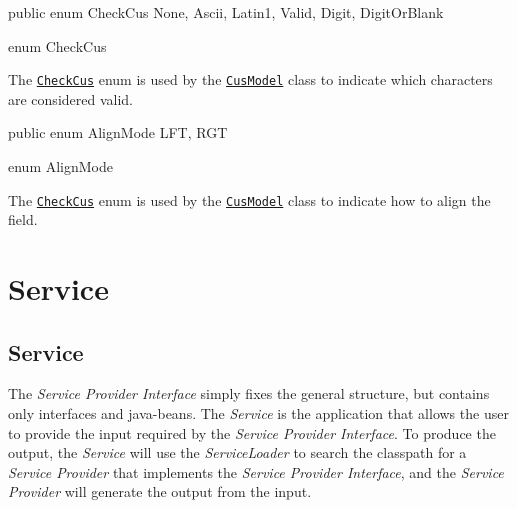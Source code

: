 \documentclass[a4paper,10pt]{report}
\newenvironment{elisting}[1][H]
  {\captionsetup{aboveskip=0pt}\begin{listing}[#1]}
  {\end{listing}%
}
\begin{document}
\begin{elisting}
\begin{javacode}
public enum CheckCus { None, Ascii, Latin1, Valid, Digit, DigitOrBlank }
\end{javacode}
\caption{enum CheckCus}\label{lst:CheckCus}
\end{elisting}
The \hyperref[lst:CheckCus]{\texttt{CheckCus}} enum is used by the 
\hyperref[lst:CusModel]{\texttt{CusModel}} class to indicate which characters 
are considered valid.

\begin{elisting}
\begin{javacode}
public enum AlignMode { LFT, RGT }
\end{javacode}
\caption{enum AlignMode}\label{lst:AlignMode}
\end{elisting}
The \hyperref[lst:CheckCus]{\texttt{CheckCus}} enum is used by the 
\hyperref[lst:CusModel]{\texttt{CusModel}} class to indicate how to align the 
field.

\vfill

\part{Service}\label{vol:srv}

%                                  

\chapter*{Service}
The \textsl{Service Provider Interface} simply fixes the general structure, but 
contains only interfaces and java-beans.
The \textsl{Service} is the application that allows the user to provide the 
input required by the \textsl{Service Provider Interface}. 
To produce the output, the \textsl{Service} will use the \textsl{ServiceLoader} 
to search the classpath for a \textsl{Service Provider} that implements the 
\textsl{Service Provider Interface}, and the \textsl{Service Provider} will 
generate the output from the input.
\end{document}
